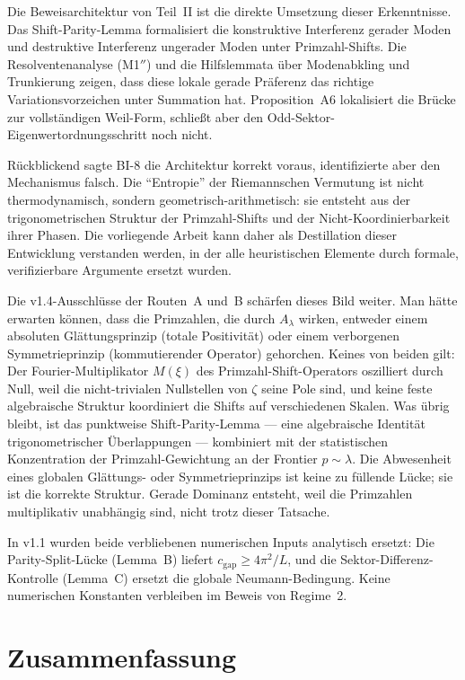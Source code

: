 \documentclass[12pt,a4paper]{article}
\theoremstyle{definition}
\theoremstyle{remark}
\begin{document}
Die Beweisarchitektur von Teil~II ist die direkte Umsetzung dieser Erkenntnisse. Das Shift-Parity-Lemma formalisiert die konstruktive Interferenz gerader Moden und destruktive Interferenz ungerader Moden unter Primzahl-Shifts. Die Resolventenanalyse (M1$''$) und die Hilfslemmata über Modenabkling und Trunkierung zeigen, dass diese lokale gerade Präferenz das richtige Variationsvorzeichen unter Summation hat. Proposition~A6 lokalisiert die Brücke zur vollständigen Weil-Form, schließt aber den Odd-Sektor-Eigenwertordnungsschritt noch nicht.

Rückblickend sagte BI-8 die Architektur korrekt voraus, identifizierte aber den Mechanismus falsch. Die ``Entropie'' der Riemannschen Vermutung ist nicht thermodynamisch, sondern geometrisch-arithmetisch: sie entsteht aus der trigonometrischen Struktur der Primzahl-Shifts und der Nicht-Koordinierbarkeit ihrer Phasen. Die vorliegende Arbeit kann daher als Destillation dieser Entwicklung verstanden werden, in der alle heuristischen Elemente durch formale, verifizierbare Argumente ersetzt wurden.

Die v1.4-Ausschlüsse der Routen~A und~B schärfen dieses Bild weiter. Man hätte erwarten können, dass die Primzahlen, die durch $A_\lambda$ wirken, entweder einem absoluten Glättungsprinzip (totale Positivität) oder einem verborgenen Symmetrieprinzip (kommutierender Operator) gehorchen. Keines von beiden gilt: Der Fourier-Multiplikator $M(\xi)$ des Primzahl-Shift-Operators oszilliert durch Null, weil die nicht-trivialen Nullstellen von $\zeta$ seine Pole sind, und keine feste algebraische Struktur koordiniert die Shifts auf verschiedenen Skalen. Was übrig bleibt, ist das punktweise Shift-Parity-Lemma --- eine algebraische Identität trigonometrischer Überlappungen --- kombiniert mit der statistischen Konzentration der Primzahl-Gewichtung an der Frontier $p \sim \lambda$. Die Abwesenheit eines globalen Glättungs- oder Symmetrieprinzips ist keine zu füllende Lücke; sie ist die korrekte Struktur. Gerade Dominanz entsteht, weil die Primzahlen multiplikativ unabhängig sind, nicht trotz dieser Tatsache.

In v1.1 wurden beide verbliebenen numerischen Inputs analytisch ersetzt: Die Parity-Split-Lücke (Lemma~B) liefert $c_{\mathrm{gap}} \geq 4\pi^2/L$, und die Sektor-Differenz-Kontrolle (Lemma~C) ersetzt die globale Neumann-Bedingung. Keine numerischen Konstanten verbleiben im Beweis von Regime~2.


\section{Zusammenfassung}
\label{sec:summary}
\end{document}
